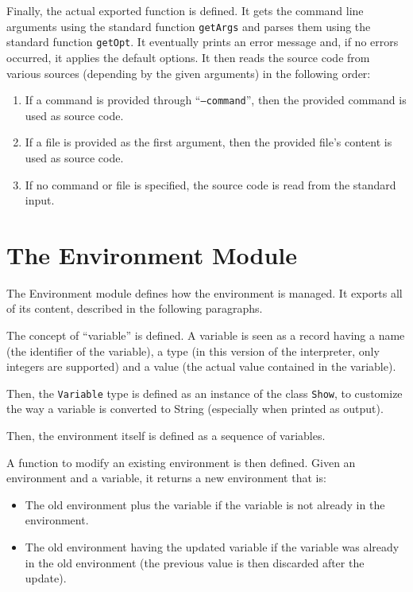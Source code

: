 \documentclass{esposito-documentation}
\begin{document}


Finally, the actual exported function is defined. It gets the command line arguments using the standard function \lstinline|getArgs| and parses them using the standard function \lstinline|getOpt|. It eventually prints an error message and, if no errors occurred, it applies the default options. It then reads the source code from various sources (depending by the given arguments) in the following order:
\begin{enumerate}
	\item If a command is provided through ``\texttt{--command}'', then the
		provided command is used as source code.
	\item If a file is provided as the first argument, then the provided file's
		content is used as source code.
	\item If no command or file is specified, the source code is read from the
		standard input.
\end{enumerate}


\section{The Environment Module}


The Environment module defines how the environment is managed. It exports all of its content, described in the following paragraphs.

The concept of ``variable'' is defined. A variable is seen as a record having a
name (the identifier of the variable), a type (in this version of the
interpreter, only integers are supported) and a value (the actual value
contained in the variable).



Then, the \lstinline|Variable| type is defined as an instance of the class
\lstinline|Show|, to customize the way a variable is converted to String
(especially when printed as output).



Then, the environment itself is defined as a sequence of variables.



A function to modify an existing environment is then defined. Given an environment and a variable, it returns a new environment that is:
\begin{itemize}
	\item The old environment plus the variable if the variable is not already
		in the environment.
	\item The old environment having the updated variable if the variable was
		already in the old environment (the previous value is then discarded
		after the update).
\end{itemize}

\end{document}
